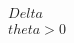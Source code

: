 \documentclass[preview]{standalone}
\begin{document}
\begin{align*}
\quad\\Delta \quad\\theta > 0
\end{align*}
\end{document}
